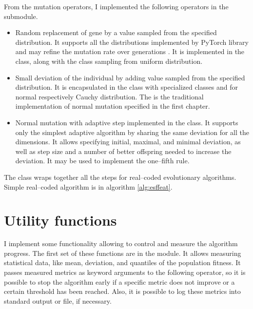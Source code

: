 From the mutation operators, I implemented the following operators in the  submodule.
\begin{itemize}
    \item Random replacement of gene by a value sampled from the specified distribution. It supports all the distributions implemented by PyTorch library and may refine the mutation rate over generations \citep{PyTorchDoc}. It is implemented in the  class, along with the  class sampling from uniform distribution.
    \item Small deviation of the individual by adding value sampled from the specified distribution. It is encapsulated in the  class with specialized classes  and  for normal respectively Cauchy distribution. The  is the traditional implementation of normal mutation specified in the first chapter.
    \item Normal mutation with adaptive step implemented in the  class. It supports only the simplest adaptive algorithm by sharing the same deviation for all the dimensions. It allows specifying initial, maximal, and minimal deviation, as well as step size and a number of better offspring needed to increase the deviation. It may be used to implement the one--fifth rule.
\end{itemize}

The  class wraps together all the steps for real--coded evolutionary algorithms. Simple real--coded algorithm is in algorithm \ref{alg:esffeat}.
    



\section{Utility functions}

I implement some functionality allowing to control and measure the algorithm progress. The first set of these functions are in the  module. It allows measuring statistical data, like mean, deviation, and quantiles of the population fitness. It passes measured metrics as keyword arguments to the following operator, so it is possible to stop the algorithm early if a specific metric does not improve or a certain threshold has been reached. Also, it is possible to log these metrics into standard output or file, if necessary.

